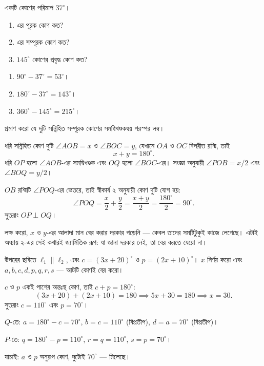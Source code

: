 \documentclass[11pt]{article}
\begin{document}
 একটি কোণের পরিমাপ $37^\circ$।
\begin{enumerate}
  \item এর পূরক কোণ কত?
  \item এর সম্পূরক কোণ কত?
  \item $145^\circ$ কোণের প্রবৃদ্ধ কোণ কত?
\end{enumerate}

\begin{sol}
\begin{enumerate}
  \item $90^\circ - 37^\circ = 53^\circ$।
  \item $180^\circ - 37^\circ = 143^\circ$।
  \item $360^\circ - 145^\circ = 215^\circ$।
\end{enumerate}
\end{sol}

 প্রমাণ করো যে দুটি সন্নিহিত সম্পূরক কোণের সমদ্বিখণ্ডকদ্বয় পরস্পর লম্ব।

\begin{sol}
ধরি সন্নিহিত কোণ দুটি $\angle AOB = x$ ও $\angle BOC = y$, যেখানে $OA$ ও $OC$
বিপরীত রশ্মি, তাই
\[
  x + y = 180^\circ .
\]
ধরি $OP$ হলো $\angle AOB$-এর সমদ্বিখণ্ডক এবং $OQ$ হলো $\angle BOC$-এর। সংজ্ঞা
অনুযায়ী $\angle POB = x/2$ এবং $\angle BOQ = y/2$।

$OB$ রশ্মিটি $\angle POQ$-এর ভেতরে, তাই স্বীকার্য ২ অনুযায়ী কোণ দুটি যোগ হয়:
\[
  \angle POQ = \frac{x}{2} + \frac{y}{2} = \frac{x+y}{2} = \frac{180^\circ}{2}
  = 90^\circ .
\]
সুতরাং $OP \perp OQ$।

লক্ষ করো, $x$ ও $y$-এর আলাদা মান বের করার দরকার পড়েনি --- কেবল তাদের সমষ্টিটুকুই
কাজে লেগেছে। এটাই অধ্যায় ২-এর সেই কথারই জ্যামিতিক রূপ: যা জানা দরকার নেই,
তা বের করতে যেয়ো না।
\end{sol}

 উপরের ছবিতে $\ell_1 \parallel \ell_2$, এবং $c = (3x + 20)^\circ$ ও
$p = (2x + 10)^\circ$। $x$ নির্ণয় করো এবং $a, b, c, d, p, q, r, s$ --- আটটি
কোণই বের করো।

\begin{sol}
$c$ ও $p$ একই পাশের অন্তঃস্থ কোণ, তাই $c + p = 180^\circ$:
\[
  (3x + 20) + (2x + 10) = 180 \implies 5x + 30 = 180 \implies x = 30 .
\]
সুতরাং $c = 110^\circ$ এবং $p = 70^\circ$।

$Q$-তে: $a = 180^\circ - c = 70^\circ$, $b = c = 110^\circ$ (বিপ্রতীপ),
$d = a = 70^\circ$ (বিপ্রতীপ)।

$P$-তে: $q = 180^\circ - p = 110^\circ$, $r = q = 110^\circ$,
$s = p = 70^\circ$।

যাচাই: $a$ ও $p$ অনুরূপ কোণ, দুটোই $70^\circ$ --- মিলেছে।
\end{sol}
\end{document}

